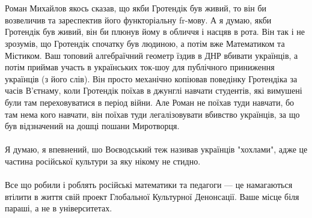 \\
\\
Роман Михайлов якось сказав, що якби Гротендік був живий, то він би возвеличив та зареспектив його функторіальну fr-мову. А я думаю, якби Гротендік був живий, він би плюнув йому в обличчя і насцяв в рота. Він так і не зрозумів, що Гротендік спочатку був людиною, а потім вже Математиком та Містиком. Ваш топовий алгебраїчний геометр їздив в ДНР вбивати українців, а потім приймав участь в українських ток-шоу для публічного приниження українців (з його слів). Він просто механічно копіював поведінку Гротендіка за часів В'єтнаму, коли Гротендік поїхав в джунглі навчати студентів, які вимушені були там переховуватися в період війни. Але Роман не поїхав туди навчати, бо там нема кого навчати, він поїхав туди легалізовувати вбивство українців, за що був відзначений на дошці пошани Миротворця.
\\
\\
Я думаю, я впевнений, шо Воєводський теж називав українців "хохлами", адже це частина російської культури за яку нікому не стидно.
\\
\\
Все що робили і роблять російські математики та педагоги — це намагаються втілити в життя свій проект Глобальної Культурної Денонсації. Ваше місце біля параші, а не в університетах.

\normalsize
